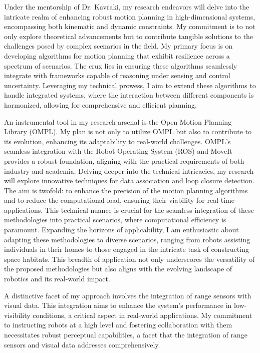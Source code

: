 \documentclass[a4,20pt]{article}
\begin{document}
\begin{large}
Under the mentorship of Dr. Kavraki, my research endeavors will delve into the intricate realm of enhancing robust motion planning in high-dimensional systems, encompassing both kinematic and dynamic constraints. My commitment is to not only explore theoretical advancements but to contribute tangible solutions to the challenges posed by complex scenarios in the field. My primary focus is on developing algorithms for motion planning that exhibit resilience across a spectrum of scenarios. The crux lies in ensuring these algorithms seamlessly integrate with frameworks capable of reasoning under sensing and control uncertainty. Leveraging my technical prowess, I aim to extend these algorithms to handle integrated systems, where the interaction between different components is harmonized, allowing for comprehensive and efficient planning.

An instrumental tool in my research arsenal is the Open Motion Planning Library (OMPL). My plan is not only to utilize OMPL but also to contribute to its evolution, enhancing its adaptability to real-world challenges. OMPL's seamless integration with the Robot Operating System (ROS) and MoveIt provides a robust foundation, aligning with the practical requirements of both industry and academia. Delving deeper into the technical intricacies, my research will explore innovative techniques for data association and loop closure detection. The aim is twofold: to enhance the precision of the motion planning algorithms and to reduce the computational load, ensuring their viability for real-time applications. This technical nuance is crucial for the seamless integration of these methodologies into practical scenarios, where computational efficiency is paramount. Expanding the horizons of applicability, I am enthusiastic about adapting these methodologies to diverse scenarios, ranging from robots assisting individuals in their homes to those engaged in the intricate task of constructing space habitats. This breadth of application not only underscores the versatility of the proposed methodologies but also aligns with the evolving landscape of robotics and its real-world impact.

A distinctive facet of my approach involves the integration of range sensors with visual data. This integration aims to enhance the system's performance in low-visibility conditions, a critical aspect in real-world applications. My commitment to instructing robots at a high level and fostering collaboration with them necessitates robust perceptual capabilities, a facet that the integration of range sensors and visual data addresses comprehensively.


\end{large}
\end{document}
